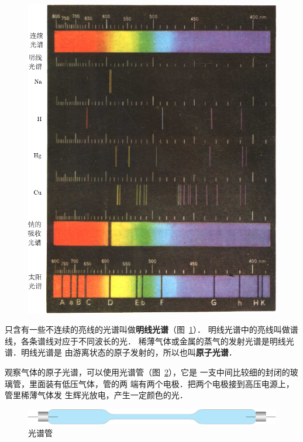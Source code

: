 \begin{figure}[htbp]
	\centering
	\includegraphics{fig/C/0-6-7-8-9.pdf}
	\caption{}\label{fig_C_0-6-7-8-9}
\end{figure}


只含有一些不连续的亮线的光谱叫做\textbf{明线光谱}（图~\ref{fig_C_0-6-7-8-9}）．
明线光谱中的亮线叫做谱线，各条谱线对应于不同波长的光．
稀薄气体或金属的蒸气的发射光谱是明线光谱．明线光谱是
由游离状态的原子发射的，所以也叫\textbf{原子光谱}．


观察气体的原子光谱，可以使用光谱管（图~\ref{fig_C_6-19}），它是
一支中间比较细的封闭的玻璃管，里面装有低压气体，管的两
端有两个电极．把两个电极接到高压电源上，管里稀薄气体发
生辉光放电，产生一定颜色的光．
\begin{figure}[htbp]
	\centering
	\includegraphics{fig/C/6-19.pdf}
	\caption{光谱管}\label{fig_C_6-19}
\end{figure}



